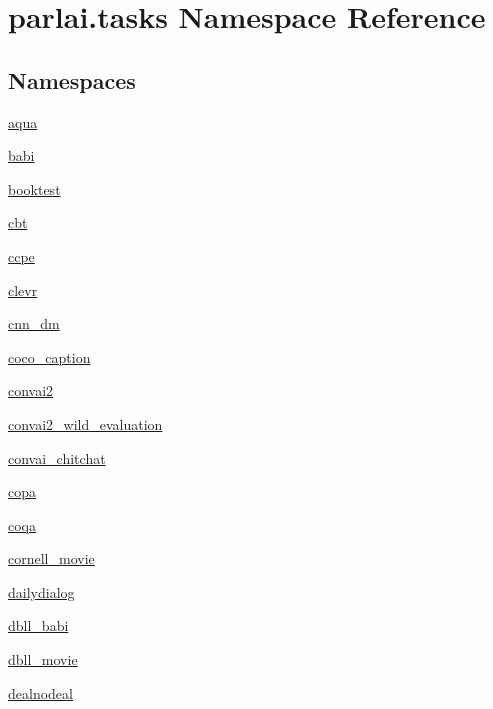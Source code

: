 \hypertarget{namespaceparlai_1_1tasks}{}\section{parlai.\+tasks Namespace Reference}
\label{namespaceparlai_1_1tasks}
\subsection*{Namespaces}
\begin{DoxyCompactItemize}
\item 
 \hyperlink{namespaceparlai_1_1tasks_1_1aqua}{aqua}
\item 
 \hyperlink{namespaceparlai_1_1tasks_1_1babi}{babi}
\item 
 \hyperlink{namespaceparlai_1_1tasks_1_1booktest}{booktest}
\item 
 \hyperlink{namespaceparlai_1_1tasks_1_1cbt}{cbt}
\item 
 \hyperlink{namespaceparlai_1_1tasks_1_1ccpe}{ccpe}
\item 
 \hyperlink{namespaceparlai_1_1tasks_1_1clevr}{clevr}
\item 
 \hyperlink{namespaceparlai_1_1tasks_1_1cnn__dm}{cnn\+\_\+dm}
\item 
 \hyperlink{namespaceparlai_1_1tasks_1_1coco__caption}{coco\+\_\+caption}
\item 
 \hyperlink{namespaceparlai_1_1tasks_1_1convai2}{convai2}
\item 
 \hyperlink{namespaceparlai_1_1tasks_1_1convai2__wild__evaluation}{convai2\+\_\+wild\+\_\+evaluation}
\item 
 \hyperlink{namespaceparlai_1_1tasks_1_1convai__chitchat}{convai\+\_\+chitchat}
\item 
 \hyperlink{namespaceparlai_1_1tasks_1_1copa}{copa}
\item 
 \hyperlink{namespaceparlai_1_1tasks_1_1coqa}{coqa}
\item 
 \hyperlink{namespaceparlai_1_1tasks_1_1cornell__movie}{cornell\+\_\+movie}
\item 
 \hyperlink{namespaceparlai_1_1tasks_1_1dailydialog}{dailydialog}
\item 
 \hyperlink{namespaceparlai_1_1tasks_1_1dbll__babi}{dbll\+\_\+babi}
\item 
 \hyperlink{namespaceparlai_1_1tasks_1_1dbll__movie}{dbll\+\_\+movie}
\item 
 \hyperlink{namespaceparlai_1_1tasks_1_1dealnodeal}{dealnodeal}
\item 

\end{DoxyCompactItemize}
